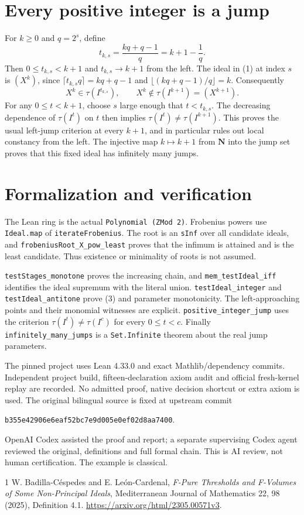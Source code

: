 \documentclass[11pt]{article}
\begin{document}
\section{Every positive integer is a jump}
For $k\geq0$ and $q=2^s$, define
\[
 t_{k,s}=\frac{kq+q-1}{q}=k+1-\frac1q.
\]
Then $0\leq t_{k,s}<k+1$ and $t_{k,s}\to k+1$ from the left.
The ideal in (1) at index $s$ is $(X^k)$, since
$\lceil t_{k,s}q\rceil=kq+q-1$ and
$\lfloor(kq+q-1)/q\rfloor=k$. Consequently
\[
 X^k\in\tau(I^{t_{k,s}}),\qquad
 X^k\notin\tau(I^{k+1})=(X^{k+1}).
\]
For any $0\leq t<k+1$, choose $s$ large enough that $t<t_{k,s}$.
The decreasing dependence of $\tau(I^t)$ on $t$ then implies
$\tau(I^t)\ne\tau(I^{k+1})$. This proves the usual left-jump criterion
at every $k+1$, and in particular rules out local constancy from the left.
The injective map $k\mapsto k+1$ from $\mathbf N$ into the jump set proves
that this fixed ideal has infinitely many jumps.

\section{Formalization and verification}
The Lean ring is the actual \texttt{Polynomial (ZMod 2)}. Frobenius powers
use \texttt{Ideal.map} of \texttt{iterateFrobenius}. The root is an
\texttt{sInf} over all candidate ideals, and
\texttt{frobeniusRoot\_\allowbreak X\_\allowbreak pow\_\allowbreak least}
proves that the infimum is attained and is the least candidate.
Thus existence or minimality of roots is not assumed.

\texttt{testStages\_\allowbreak monotone} proves the increasing chain,
and \texttt{mem\_\allowbreak testIdeal\_\allowbreak iff} identifies the
ideal supremum with the literal union. \texttt{testIdeal\_\allowbreak integer}
and \texttt{testIdeal\_\allowbreak antitone} prove (3) and parameter
monotonicity. The left-approaching points and their monomial witnesses
are explicit. \texttt{positive\_\allowbreak integer\_\allowbreak jump}
uses the criterion $\tau(I^t)\ne\tau(I^c)$ for every $0\leq t<c$.
Finally \texttt{infinitely\_\allowbreak many\_\allowbreak jumps} is a
\texttt{Set.Infinite} theorem about the real jump parameters.

The pinned project uses Lean 4.33.0 and exact Mathlib/dependency commits.
Independent project build, fifteen-declaration axiom audit and official
fresh-kernel replay are recorded. No admitted proof, native decision
shortcut or extra axiom is used. The original bilingual source is fixed at
upstream commit\par\noindent
\texttt{b355e42906e6eaf52bc7e9d005e0ef02d8aa7400}.\par
OpenAI Codex assisted the proof and report; a separate supervising Codex
agent reviewed the original, definitions and full formal chain. This is
AI review, not human certification. The example is classical.

\begin{thebibliography}{1}
 W. Badilla-C\'espedes and E. Le\'on-Cardenal,
\emph{F-Pure Thresholds and F-Volumes of Some Non-Principal Ideals},
Mediterranean Journal of Mathematics 22, 98 (2025), Definition 4.1.
\url{https://arxiv.org/html/2305.00571v3}.
\end{thebibliography}
\end{document}
